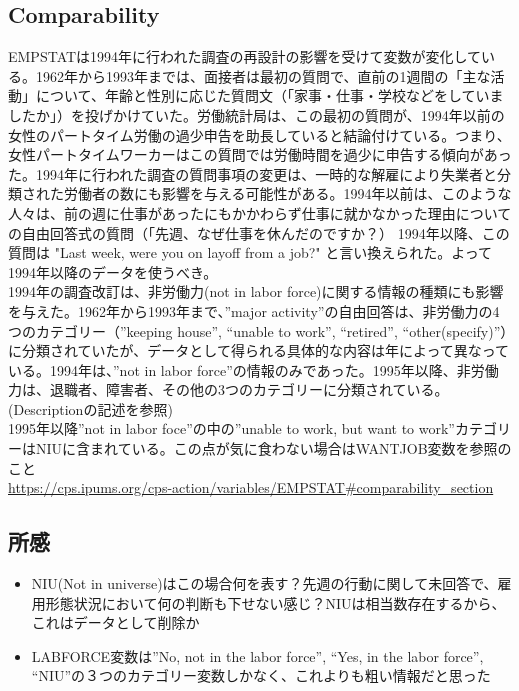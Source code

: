 \documentclass{jsarticle}
\begin{document}
\subsection{Comparability}
EMPSTATは1994年に行われた調査の再設計の影響を受けて変数が変化している。1962年から1993年までは、面接者は最初の質問で、直前の1週間の「主な活動」について、年齢と性別に応じた質問文（「家事・仕事・学校などをしていましたか」）を投げかけていた。労働統計局は、この最初の質問が、1994年以前の女性のパートタイム労働の過少申告を助長していると結論付けている。つまり、女性パートタイムワーカーはこの質問では労働時間を過少に申告する傾向があった。1994年に行われた調査の質問事項の変更は、一時的な解雇により失業者と分類された労働者の数にも影響を与える可能性がある。1994年以前は、このような人々は、前の週に仕事があったにもかかわらず仕事に就かなかった理由についての自由回答式の質問（「先週、なぜ仕事を休んだのですか？） 1994年以降、この質問は "Last week, were you on layoff from a job?" と言い換えられた。よって1994年以降のデータを使うべき。\\

1994年の調査改訂は、非労働力(not in labor force)に関する情報の種類にも影響を与えた。1962年から1993年まで、”major activity”の自由回答は、非労働力の4つのカテゴリー（”keeping house”, “unable to work”, “retired”, “other(specify)”）に分類されていたが、データとして得られる具体的な内容は年によって異なっている。1994年は、”not in labor force”の情報のみであった。1995年以降、非労働力は、退職者、障害者、その他の3つのカテゴリーに分類されている。(Descriptionの記述を参照)\\

1995年以降”not in labor foce”の中の”unable to work, but want to work”カテゴリーはNIUに含まれている。この点が気に食わない場合はWANTJOB変数を参照のこと\\
\url{https://cps.ipums.org/cps-action/variables/EMPSTAT#comparability_section}

\subsection{所感}
\begin{itemize}
    \item NIU(Not in universe)はこの場合何を表す？先週の行動に関して未回答で、雇用形態状況において何の判断も下せない感じ？NIUは相当数存在するから、これはデータとして削除か
    \item LABFORCE変数は”No, not in the labor force”, “Yes, in the labor force”, “NIU”の３つのカテゴリー変数しかなく、これよりも粗い情報だと思った
\end{itemize}
\end{document}
